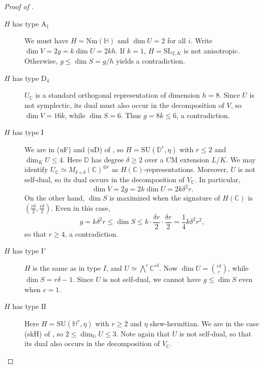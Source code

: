 \documentclass[12pt]{amsart}
\newcommand{\C}{\mathbb{C}}
\newcommand{\SL}{\mathrm{SL}}
\theoremstyle{definition}
\numberwithin{equation}{section}
\begin{document}
\begin{proof}[Proof of ]
\begin{description}
    \item[\(H\) has type \(\mathrm{A}_1\)] We must have \(H = \mathrm{Nm}(\mathbb{H})\)
    and \(\dim U = 2\) for all \(i\). 
    Write \(\dim V = 2g = k \dim U = 2kh\). If \(k = 1\), \(H = \SL_{2, K}\) is not 
    anisotropic. Otherwise, \(g \leq \dim S = g/h\) yields a contradiction.
    \item[\(H\) has type \(\mathrm{D}_4\)] \(U_\C\) is a standard orthogonal representation of 
    dimension \(h = 8\). Since \(U\) is not symplectic, its dual must also occur 
    in the decomposition of \(V\), so \(\dim V = 16k\), while \(\dim S = 6\). 
    Thus \(g = 8k \leq 6\), a contradiction.
    \item[\(H\) has type \(\mathrm{I}\)] We are in (uF) and (uD) of ,
    so \(H = \mathrm{SU}(\mathbb{D}^r, \eta)\) with \(r \leq 2\) and \(\dim_K U \leq 4\).
    Here \(\mathbb{D}\) has degree \(\delta \geq 2\) over a CM extension \(L/K\). 
    We may identify \(U_\C \simeq M_{\delta \times \delta}(\C)^{\oplus r}\) as 
    \(H(\C)\)-representations. Moreover, \(U\) is not self-dual, so its dual 
    occurs in the decomposition of \(V_\C\). In particular, 
    \begin{equation*}
        \dim V = 2g = 2k \dim U = 2 k \delta^2 r.
    \end{equation*}
    On the other hand, \(\dim S\) is maximized when the signature of \(H(\C)\) is 
    \((\frac{r\delta}{2}, \frac{r \delta}{2})\). Even in this case,
    \begin{equation*}
        g = k \delta^2 r \leq \dim S \leq k \cdot \frac{\delta r}{2} \cdot \frac{\delta r}{2} = 
        \frac{1}{4} k \delta^2 r^2,
    \end{equation*}
    so that \(r \geq 4\), a contradiction.
    \item[\(H\) has type \(\mathrm{I}'\)] \(H\) is the same as in type \(I\), and 
    \(U \simeq \bigwedge^c \C^{r \delta}\). Now \(\dim U = \binom{r \delta}{c}\), while 
    \(\dim S = r\delta - 1\). Since \(U\) is not self-dual, we cannot have 
    \(g \leq \dim S\) even when \(c = 1\).
    \item[\(H\) has type \(\mathrm{II}\)] Here \(H = \mathrm{SU}(\mathbb{H}^r, \eta)\) with 
    \(r \geq 2\) and \(\eta\) skew-hermitian. We are in the case (skH) of 
    , so \(2 \leq \dim_\mathbb{H} U \leq 3\). 
    Note again that \(U\) is not self-dual, so that its dual also occurs in the 
    decomposition of \(V_\C\).

\end{description}
\end{proof}
\end{document}
